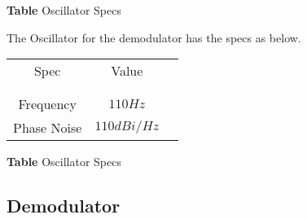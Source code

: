 \documentclass[]{article}
\begin{document}
        \begin{center}
            \textbf{Table} Oscillator Specs
        \end{center}

        The Oscillator for the demodulator has the specs as below.

        \begin{center}
            \begin{tabular}{c c c}
                Spec & Value \\ \\ \hline \\
                Frequency & $110Hz$ \\
                Phase Noise & $110dBi/Hz$ \\
            \end{tabular}
        \end{center}

        \begin{center}
            \textbf{Table} Oscillator Specs
        \end{center}

    \subsection{Demodulator}
\end{document}

